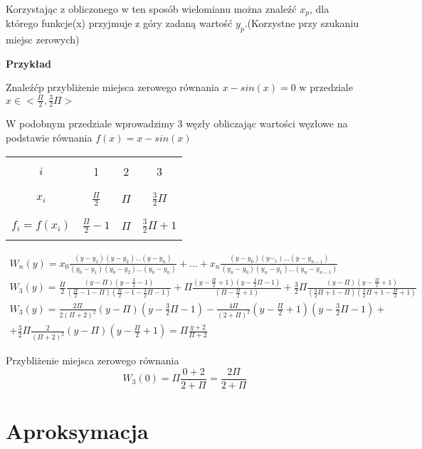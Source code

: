 \documentclass[10pt, a4paper]{article}
\begin{document}
Korzystając z obliczonego w ten sposób wielomianu można znaleźć $x_p$, dla którego funkcje(x) przyjmuje z góry zadaną wartość $y_p$.(Korzystne przy szukaniu miejsc zerowych)

\textbf{Przykład}

Znaleźćp przybliżenie miejsca zerowego równania $x-sin(x)=0$ w przedziale $x\in<\frac{\Pi}{2},\frac{3}{2}\Pi>$

W podobnym przedziale wprowadzimy 3 węzły obliczając wartości węzłowe na podstawie równania $f(x)=x-sin(x)$

\begin{center}
\begin{tabular}{|c|c|c|c|}
\hline
&&&\\
$i$ & 1 & 2 & 3\\
&&&\\
\hline
&&&\\
$x_i$ & $\frac{\Pi}{2}$&$\Pi$&$\frac{3}{2}\Pi$\\
&&&\\
\hline
&&&\\
$f_i=f(x_i)$&$\frac{\Pi}{2}-1$&$\Pi$&$\frac{3}{2}\Pi+1$\\
&&&\\
\hline
\end{tabular}
\end{center}

\begin{gather*}
W_n(y)=x_0\frac{(y-y_1)(y-y_2)\dots(y-y_n)}{(y_0-y_1)(y_0-y_2)\dots(y_0-y_n)}+\dots+x_n\frac{(y-y_0)(y-_1)\dots(y-y_{n-1})}{(y_n-y_0)(y_n-y_1)\dots(y_n-y_{n-1})}\\
W_3(y)=\frac{\Pi}{2}\frac{(y-\Pi)(y-\frac{3}{2}-1)}{(\frac{\Pi}{2}-1-\Pi)(\frac{\Pi}{2}-1-\frac{3}{2}\Pi-1)}+\Pi\frac{(y-\frac{\Pi}{2}+1)(y-\frac{3}{2}\Pi-1)}{(\Pi-\frac{\Pi}{2}+1)}+\frac{3}{2}\Pi\frac{(y-\Pi)(y-\frac{\Pi}{2}+1)}{(\frac{3}{2}\Pi+1-\Pi)(\frac{3}{2}\Pi+1-\frac{\Pi}{2}+1)}\\
W_3(y)=\frac{2\Pi}{2(\Pi+2)^2}(y-\Pi)(y-\frac{3}{2}\Pi-1)-\frac{4\Pi}{(2+\Pi)^2}(y-\frac{\Pi}{2}+1)(y-\frac{3}{2}\Pi-1)+\\
+\frac{3}{2}\Pi\frac{2}{(\Pi+2)^2}(y-\Pi)(y-\frac{\Pi}{2}+1)=\Pi\frac{y+2}{\Pi+2}
\end{gather*}

Przybliżenie miejsca zerowego równania \[W_3(0)=\Pi\frac{0+2}{2+\Pi}=\frac{2\Pi}{2+\Pi}\]

\section*{Aproksymacja}
\end{document}

